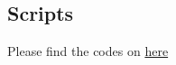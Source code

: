 \documentclass[11pt]{article}
\begin{document}

\appendix

\subsection*{Scripts}
Please find the codes on \url{here}
%
\end{document}
